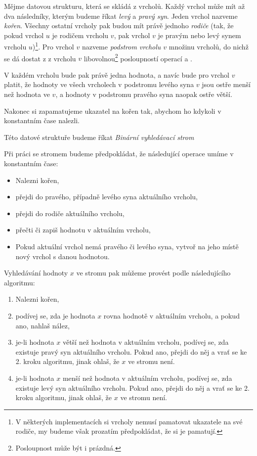 \begin{definice}
Mějme datovou strukturu, která se skládá z vrcholů. Každý vrchol může mít až
dva následníky, kterým budeme říkat \emph{levý} a \emph{pravý syn}. Jeden
vrchol nazveme \emph{kořen}. Všechny ostatní vrcholy pak budou mít právě
jednoho \emph{rodiče} (tak, že pokud vrchol $u$ je rodičem vrcholu $v$, pak
vrchol $v$ je pravým nebo levý synem vrcholu $u$)\footnote{V některých implementacích si vrcholy nemusí pamatovat ukazatele na své rodiče, my budeme však prozatím předpokládat, že si je pamatují.}. Pro vrchol $v$ nazveme
\emph{podstrom vrcholu $v$} množinu vrcholů, do nichž se dá dostat z z vrcholu
$v$ libovolnou\footnote{Posloupnost může být i prázdná.} posloupností operací  a .

V každém vrcholu bude pak právě jedna hodnota, a navíc bude pro vrchol $v$ platit, že hodnoty ve všech vrcholech v podstromu levého syna $v$ jsou ostře menší než hodnota ve $v$, a hodnoty v podstromu pravého syna naopak ostře větší.

Nakonec si zapamatujeme ukazatel na kořen tak, abychom ho kdykoli v konstantním čase nalezli.

Této datové struktuře budeme říkat \emph{Binární vyhledávací strom}
\end{definice}

Při práci se stromem budeme předpokládat, že následující operace umíme v konstantním čase:
\begin{itemize}
\item Nalezni kořen,
\item přejdi do pravého, případně levého syna aktuálního vrcholu,
\item přejdi do rodiče aktuálního vrcholu,
\item přečti či zapiš hodnotu v aktuálním vrcholu,
\item Pokud aktuální vrchol nemá pravého či levého syna, vytvoř na jeho místě nový vrchol s danou hodnotou.
\end{itemize}
Vyhledávání hodnoty $x$ ve stromu pak můžeme provést podle následujícího algoritmu:
\begin{enumerate}
\item Nalezni kořen,
\item podívej se, zda je hodnota $x$ rovna hodnotě v aktuálním vrcholu, a pokud ano, nahlaš nález,
\item je-li hodnota $x$ větší než hodnota v aktuálním vrcholu, podívej se, zda existuje pravý syn aktuálního vrcholu. Pokud ano, přejdi do něj a vrať se ke 2. kroku algoritmu, jinak ohlaš, že  $x$ ve stromu není.
\item je-li hodnota $x$ menší než hodnota v aktuálním vrcholu, podívej se, zda existuje levý syn aktuálního vrcholu. Pokud ano, přejdi do něj a vrať se ke 2. kroku algoritmu, jinak ohlaš, že  $x$ ve stromu není.
\end{enumerate}

